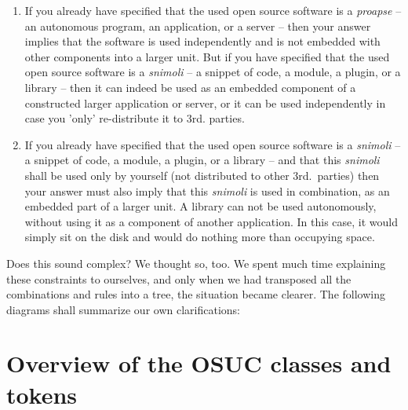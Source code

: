 \begin{enumerate}
  \label{InvalidFinderTokenCombinations}
  \item If you already have specified that the used open source software is a
  \emph{proapse} -- an autonomous program, an application, or a server -- then
  your answer implies that the software is used independently and is not
  embedded with other components into a larger unit. But if you have specified
  that the used open source software is a \emph{snimoli} -- a snippet of
  code, a module, a plugin, or a library -- then it can indeed be used as an
  embedded component of a constructed larger application or server, or it can be
  used independently in case you 'only' re-distribute it to 3rd. parties.
  
  \item If you already have specified that the used open source software is a
  \emph{snimoli} -- a snippet of code, a module, a plugin, or a library -- and
  that this \emph{snimoli} shall be used only by yourself (not distributed to
  other 3rd.\ parties) then your answer must also imply that this \emph{snimoli}
  is used in combination, as an embedded part of a larger unit. A library can
  not be used autonomously, without using it as a component of another
  application. In this case, it would simply sit on the disk and would do
  nothing more than occupying space.

\end{enumerate}

Does this sound complex? We thought so, too. We spent much time explaining these
constraints to ourselves, and only when we had transposed all the combinations
and rules into a tree, the situation became clearer. The following diagrams
shall summarize our own clarifications:

\section{Overview of the OSUC classes and tokens}


\begin{footnotesize}
\begin{minipage}{\textwidth}
\end{minipage}
\end{footnotesize}  
  
